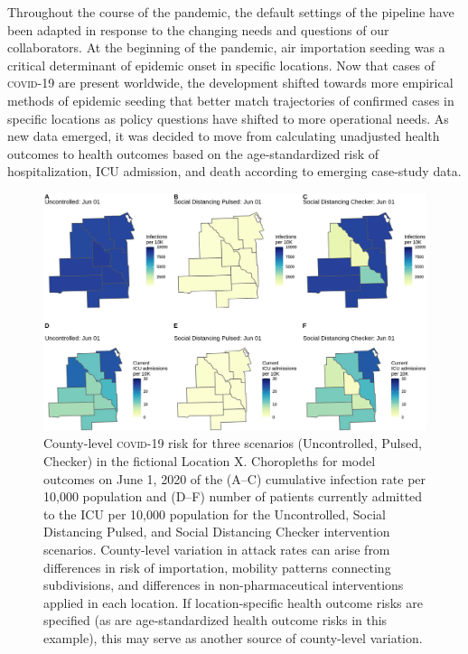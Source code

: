 Throughout the course of the pandemic, the default settings of the pipeline have been adapted in response to the changing needs and questions of our collaborators. At the beginning of the pandemic, air importation seeding was a critical determinant of epidemic onset in specific locations. Now that cases of \textsc{covid}-19 are present worldwide, the development shifted towards more empirical methods of epidemic seeding that better match trajectories of confirmed cases in specific locations as policy questions have shifted to more operational needs. As new data emerged, it was decided to move from calculating unadjusted health outcomes to health outcomes based on the age-standardized risk of hospitalization, ICU admission, and death according to emerging case-study data. 
\begin{figure}[!htb]%
    \centering
    \includegraphics{fig_pipeline/fig4a}
    \caption[County-level \textsc{covid}-19 risk for three scenarios]{County-level \textsc{covid}-19 risk for three scenarios (Uncontrolled, Pulsed, Checker) in the fictional Location X. Choropleths for model outcomes on June 1, 2020 of the (A–C) cumulative infection rate per 10,000 population and (D–F) number of patients currently admitted to the ICU per 10,000 population for the Uncontrolled, Social Distancing Pulsed, and Social Distancing Checker intervention scenarios. County-level variation in attack rates can arise from differences in risk of importation, mobility patterns connecting subdivisions, and differences in non-pharmaceutical interventions applied in each location. If location-specific health outcome risks are specified (as are age-standardized health outcome risks in this example), this may serve as another source of county-level variation.}
    \label{fig:pipeline-map}
\end{figure}
